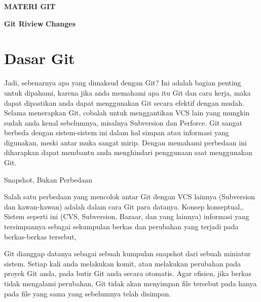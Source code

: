 
\sloppy
\begin{center}{\fontsize{16pt}{16pt}\selectfont \textbf{MATERI GIT} \\}\end{center} \par
\noindent 
\begin{center}{\fontsize{14pt}{14pt}\selectfont \textbf{Git Riview}\textbf{ Changes} \\}\end{center} \par
\noindent 
\section{Dasar Git}
\noindent 
 \hspace*{0.5in} Jadi, sebenarnya apa yang dimaksud dengan Git? Ini adalah bagian penting untuk dipahami, karena jika anda memahami apa itu Git dan cara kerja, maka dapat dipastikan anda dapat menggunakan Git secara efektif dengan mudah. Selama menerapkan Git, cobalah untuk menggantikan VCS lain yang mungkin sudah anda kenal sebelumnya, misalnya Subversion dan Perforce. Git sangat berbeda dengan sistem-sistem ini dalam hal simpan atau informasi yang digunakan, meski antar muka sangat mirip. Dengan memahami perbedaan ini diharapkan dapat membantu anda menghindari penggunaan saat menggunakan Git. \par
  \vspace{\baselineskip}
\noindent 
Snapshot, Bukan Perbedaan \par
 \vspace{\baselineskip}
\noindent 
 \hspace*{0.5in} Salah satu perbedaan yang mencolok antar Git dengan VCS lainnya (Subversion dan kawan-kawan) adalah dalam cara Git para datanya. Konsep konseptual,. Sistem seperti ini (CVS, Subversion, Bazaar, dan yang lainnya) informasi yang tersimpannya sebagai sekumpulan berkas dan perubahan yang terjadi pada berkas-berkas tersebut, \par
  \vspace{\baselineskip}
\noindent 
Git dianggap datanya sebagai sebuah kumpulan snapshot dari sebuah miniatur sistem. Setiap kali anda melakukan komit, atau melakukan perubahan pada proyek Git anda, pada butir Git anda secara otomatis. Agar efisien, jika berkas tidak mengalami perubahan, Git tidak akan menyimpan file tersebut pada hanya pada file yang sama yang sebelumnya telah disimpan. \par
 \vspace{\baselineskip}
